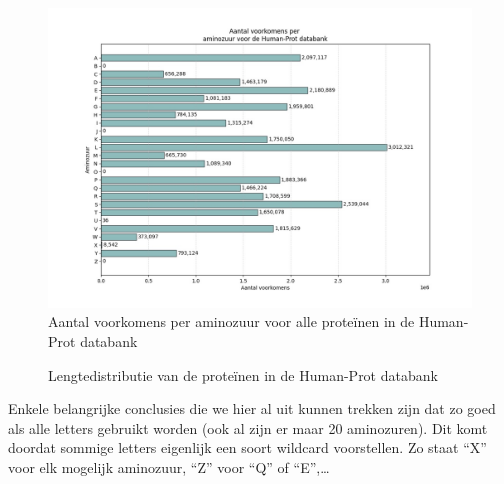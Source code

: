 \documentclass[11pt,dutch,faculty=we,layout=titlefont,underline=false,titleUppercase=true,titleUnderline=true]{ugent2016-report}
\begin{document}
    \begin{figure}[H]
        \centering
        \includegraphics[width=0.7\linewidth]{humanprot_aminozuur_voorkomens}
        \caption{Aantal voorkomens per aminozuur voor alle proteïnen in de Human-Prot databank}
        \label{fig:humanprot_aminozuur}
    \end{figure}

    \begin{figure}[H]
        \centering
        \caption{Lengtedistributie van de proteïnen in de Human-Prot databank}\label{fig:humanprot_length}
    \end{figure}

    Enkele belangrijke conclusies die we hier al uit kunnen trekken zijn dat zo goed als alle letters gebruikt worden (ook al zijn er maar 20 aminozuren).
    Dit komt doordat sommige letters eigenlijk een soort wildcard voorstellen.
    Zo staat ``X'' voor elk mogelijk aminozuur, ``Z'' voor ``Q'' of ``E'',\ldots
\end{document}
